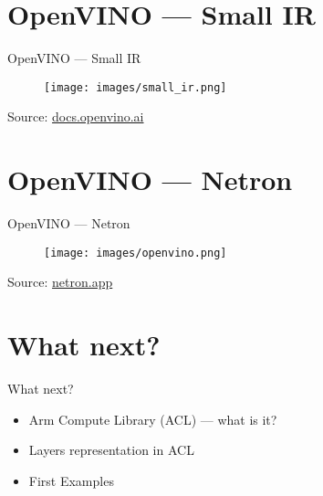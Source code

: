 \documentclass{beamer}
\begin{document}
\section{OpenVINO --- Small IR}
\begin{frame}{OpenVINO --- Small IR}
  \begin{figure}[h]
    \texttt{[image: images/small\_ir.png]}
  \end{figure}
  \footnotesize Source: \href{https://docs.openvino.ai/}{docs.openvino.ai}
\end{frame}

\section{OpenVINO --- Netron}
\begin{frame}{OpenVINO --- Netron}
  \begin{figure}[h]
    \texttt{[image: images/openvino.png]}
  \end{figure}
  \footnotesize Source: \href{https://netron.app/}{netron.app}
\end{frame}

\section{What next?}
\begin{frame}{What next?}
  \begin{itemize}
    \item Arm Compute Library (ACL) --- what is it?
    \item Layers representation in ACL
    \item First Examples
  \end{itemize}
\end{frame}
\end{document}
